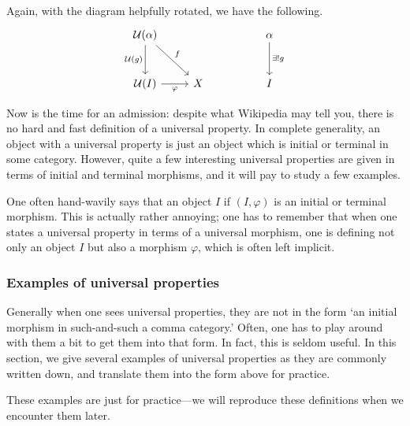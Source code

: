 \documentclass[notes.tex]{subfiles}
\begin{document}
Again, with the diagram helpfully rotated, we have the following.
\begin{equation*}
  \begin{tikzcd}[row sep=large]
    \mathcal{U}(\alpha) \arrow[d, swap, "\mathcal{U}(g)"] \arrow[rd, "f"] & & & \alpha \arrow[d, "\exists!g"]\\
    \mathcal{U}(I) \arrow[r, swap, "\varphi"] & X & & I
  \end{tikzcd}
\end{equation*}
\begin{definition}
  \label{def:universalproperty}
  Now is the time for an admission: despite what Wikipedia may tell you, there is no hard and fast definition of a universal property. In complete generality, an object with a universal property is just an object which is initial or terminal in some category. However, quite a few interesting universal properties are given in terms of initial and terminal morphisms, and it will pay to study a few examples.
\end{definition}

\begin{note}
  One often hand-wavily says that an object $I$  if $(I, \varphi)$ is an initial or terminal morphism. This is actually rather annoying; one has to remember that when one states a universal property in terms of a universal morphism, one is defining not only an object $I$ but also a morphism $\varphi$, which is often left implicit.
\end{note}


\subsubsection{Examples of universal properties}

Generally when one sees universal properties, they are not in the form `an initial morphism in such-and-such a comma category.' Often, one has to play around with them a bit to get them into that form. In fact, this is seldom useful. In this section, we give several examples of universal properties as they are commonly written down, and translate them into the form above for practice.

These examples are just for practice---we will reproduce these definitions when we encounter them later.
\end{document}
